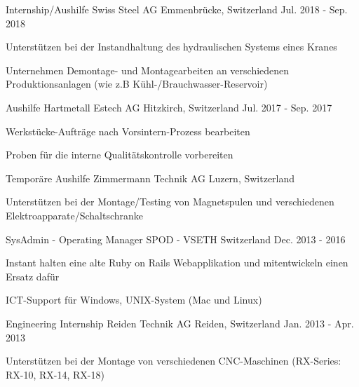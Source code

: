 \begin{cventries}
\cventry
	{Internship/Aushilfe} %
	{Swiss Steel AG} %
	{Emmenbrücke, Switzerland} %
	{Jul. 2018 - Sep. 2018} %
	{
		\begin{cvitems} %
			\item {Unterstützen bei der Instandhaltung des hydraulischen Systems eines Kranes}
			\item {Unternehmen Demontage- und Montagearbeiten an verschiedenen Produktionsanlagen (wie z.B Kühl-/Brauchwasser-Reservoir)}
		\end{cvitems}
}	

\cventry
	{Aushilfe} %
	{Hartmetall Estech AG} %
	{Hitzkirch, Switzerland} %
	{Jul. 2017 - Sep. 2017} %
	{
		\begin{cvitems} %
			\item {Werkstücke-Aufträge nach Vorsintern-Prozess bearbeiten}
			\item {Proben für die interne Qualitätskontrolle vorbereiten}
		\end{cvitems}
}

\cventry
	{Temporäre Aushilfe} %
	{Zimmermann Technik AG} %
	{Luzern, Switzerland} %
	{} %
	{
		\begin{cvitems} %
			\item {Unterstützen bei der Montage/Testing von Magnetspulen und verschiedenen Elektroapparate/Schaltschranke}
		\end{cvitems}
	}	

  \cventry
    {SysAdmin - Operating Manager} %
    {SPOD - VSETH} %
    {Switzerland} %
    {Dec. 2013 - 2016} %
    {
      \begin{cvitems} %
        \item {Instant halten eine alte Ruby on Rails Webapplikation und mitentwickeln einen Ersatz dafür}
        \item {ICT-Support für Windows, UNIX-System (Mac und Linux)}
      \end{cvitems}
    }

  \cventry
    {Engineering Internship} %
    {Reiden Technik AG} %
    {Reiden, Switzerland} %
    {Jan. 2013 - Apr. 2013} %
    {
      \begin{cvitems} %
        \item {Unterstützen bei der Montage von verschiedenen CNC-Maschinen (RX-Series: RX-10, RX-14, RX-18)}
      \end{cvitems}
    }


\end{cventries}
